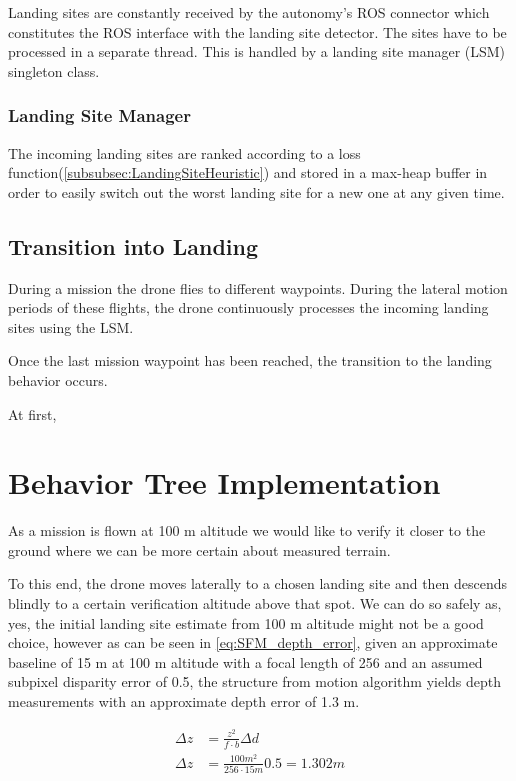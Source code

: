 Landing sites are constantly received by the autonomy's ROS connector which constitutes the ROS interface with the landing site detector. The sites have to be processed in a separate thread. This is handled by a landing site manager (LSM) singleton class.

\subsubsection{Landing Site Manager}

The incoming landing sites are ranked according to a loss function(\ref{subsubsec:LandingSiteHeuristic}) and stored in a max-heap buffer in order to easily switch out the worst landing site for a new one at any given time.

\subsection{Transition into Landing}

During a mission the drone flies to different waypoints. During the lateral motion periods of these flights, the drone continuously processes the incoming landing sites using the LSM.

Once the last mission waypoint has been reached, the transition to the landing behavior occurs.

At first, 

\section{Behavior Tree Implementation}\label{subsec:behavior_tree}

As a mission is flown at 100 m altitude we would like to verify it closer to the ground where we can be more certain about measured terrain.

To this end, the drone moves laterally to a chosen landing site and then descends blindly to a certain verification altitude above that spot. We can do so safely as, yes, the initial landing site estimate from 100 m altitude might not be a good choice, however as can be seen in \cref{eq:SFM_depth_error}, given an approximate baseline of 15 m at 100 m altitude with a focal length of 256 and an assumed subpixel disparity error of 0.5, the structure from motion algorithm yields depth measurements with an approximate depth error of 1.3 m.

\begin{align}
    {\Delta z} &= \frac{z^2}{f  \cdot b}\Delta d\\
    {\Delta z} &= \frac{100m^2}{256  \cdot 15m}0.5 = 1.302m
    \label{eq:SFM_depth_error}
\end{align}

